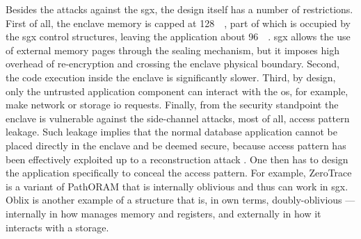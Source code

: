 			Besides the attacks against the \acrshort{sgx}, the design itself has a number of restrictions.
			First of all, the enclave memory is capped at \SI{128}{\mega\byte}, part of which is occupied by the \acrshort{sgx} control structures, leaving the application about \SI{96}{\mega\byte}.
			\acrshort{sgx} allows the use of external memory pages through the sealing mechanism, but it imposes high overhead of re-encryption and crossing the enclave physical boundary.
			Second, the code execution inside the enclave is significantly slower.
			Third, by design, only the untrusted application component can interact with the \acrshort{os}, for example, make network or storage \acrshort{io} requests.
			Finally, from the security standpoint the enclave is vulnerable against the side-channel attacks, most of all, access pattern leakage.
			Such leakage implies that the normal database application cannot be placed directly in the enclave and be deemed secure, because access pattern has been effectively exploited up to a reconstruction attack \cite{generic-attacks-kellaris}.
			One then has to design the application specifically to conceal the access pattern.
			For example, ZeroTrace \cite{zerotrace} is a variant of PathORAM \cite{path-oram} that is internally oblivious and thus can work in \acrshort{sgx}.
			Oblix \cite{oblix} is another example of a structure that is, in \textcite{oblix} own terms, doubly-oblivious --- internally in how manages memory and registers, and externally in how it interacts with a storage.
